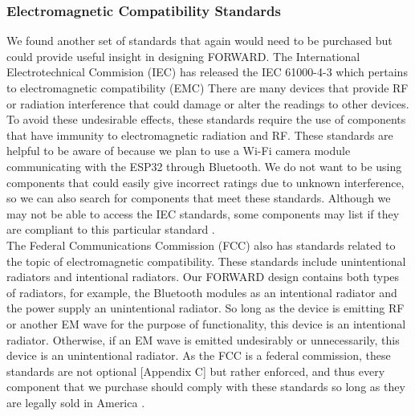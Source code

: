 \subsubsection{Electromagnetic Compatibility Standards}
\noindent We found another set of standards that again would need to be purchased but could  provide useful insight in designing FORWARD. The International Electrotechnical Commision (IEC) has released the IEC 61000-4-3 which pertains to electromagnetic compatibility (EMC) There are many devices that provide RF or radiation interference that could damage or alter the readings to other devices. To avoid these undesirable effects, these standards require the use of components that have immunity to electromagnetic radiation and RF. These standards are helpful to be aware of because we plan to use a Wi-Fi camera module communicating with the ESP32 through Bluetooth. We do not want to be using components that could easily give incorrect ratings due to unknown interference, so we can also search for components that meet these standards. Although we may not be able to access the IEC standards, some components may list if they are compliant to this particular standard \cite{iec_standard}.\\

\noindent The Federal Communications Commission (FCC) also has standards related to the topic of electromagnetic compatibility. These standards include unintentional radiators and intentional radiators. Our FORWARD design contains both types of radiators, for example, the Bluetooth modules as an intentional radiator and the power supply an unintentional radiator. So long as the device is emitting RF or another EM wave for the purpose of functionality, this device is an intentional radiator. Otherwise, if an EM wave is emitted undesirably or unnecessarily, this device is an unintentional radiator. As the FCC is a federal commission, these standards are not optional [Appendix C] but rather enforced, and thus every component that we purchase should comply with these standards so long as they are legally sold in America \cite{fcc_unintentional_radiators} \cite{fcc_intentional_radiators}.

